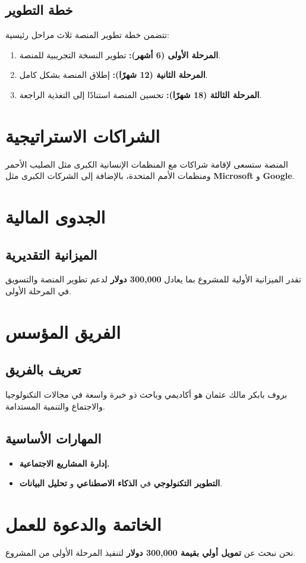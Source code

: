\documentclass[12pt]{article}
\begin{document}
\subsection*{\textcolor{sectionColor}{خطة التطوير}}
تتضمن خطة تطوير المنصة ثلاث مراحل رئيسية:
\begin{enumerate}
    \item \textbf{المرحلة الأولى (6 أشهر):} تطوير النسخة التجريبية للمنصة.
    \item \textbf{المرحلة الثانية (12 شهرًا):} إطلاق المنصة بشكل كامل.
    \item \textbf{المرحلة الثالثة (18 شهرًا):} تحسين المنصة استنادًا إلى التغذية الراجعة.
\end{enumerate}

\section{\textcolor{sectionColor}{الشراكات الاستراتيجية}}
المنصة ستسعى لإقامة شراكات مع المنظمات الإنسانية الكبرى مثل الصليب الأحمر ومنظمات الأمم المتحدة، بالإضافة إلى الشركات الكبرى مثل \textbf{Microsoft} و \textbf{Google}.

\section{\textcolor{sectionColor}{الجدوى المالية}}

\subsection*{\textcolor{sectionColor}{الميزانية التقديرية}}
تقدر الميزانية الأولية للمشروع بما يعادل \textbf{300,000 دولار} لدعم تطوير المنصة والتسويق في المرحلة الأولى.

\section{\textcolor{sectionColor}{الفريق المؤسس}}

\subsection*{\textcolor{sectionColor}{تعريف بالفريق}}
بروف بابكر مالك عثمان هو أكاديمي وباحث ذو خبرة واسعة في مجالات التكنولوجيا والاجتماع والتنمية المستدامة.

\subsection*{\textcolor{sectionColor}{المهارات الأساسية}}
\begin{itemize}
    \item \textbf{إدارة المشاريع الاجتماعية.}
    \item \textbf{التطوير التكنولوجي} في \textbf{الذكاء الاصطناعي} و \textbf{تحليل البيانات}.
\end{itemize}

\section{\textcolor{sectionColor}{الخاتمة والدعوة للعمل}}
نحن نبحث عن \textbf{تمويل أولي بقيمة 300,000 دولار} لتنفيذ المرحلة الأولى من المشروع.
\end{document}
